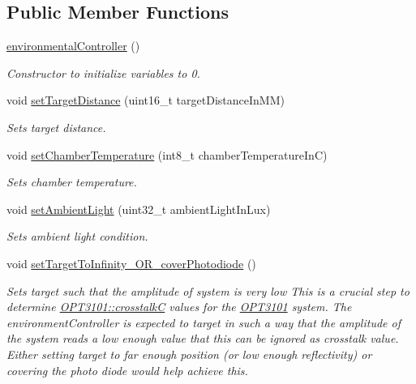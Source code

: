 \subsection*{Public Member Functions}
\begin{DoxyCompactItemize}
\item 
\mbox{\hyperlink{classenvironmental_controller_a2dbb21c983ff11a07ef763fba57b2e76}{environmental\+Controller}} ()
\begin{DoxyCompactList}\small\item\em Constructor to initialize variables to 0. \end{DoxyCompactList}\item 
void \mbox{\hyperlink{classenvironmental_controller_a8251b7f25c6a6c5583c718bac664d05b}{set\+Target\+Distance}} (uint16\+\_\+t target\+Distance\+In\+MM)
\begin{DoxyCompactList}\small\item\em Sets target distance. \end{DoxyCompactList}\item 
void \mbox{\hyperlink{classenvironmental_controller_a3c23e944f34f2d7c0fa0b279d5fc8a3f}{set\+Chamber\+Temperature}} (int8\+\_\+t chamber\+Temperature\+InC)
\begin{DoxyCompactList}\small\item\em Sets chamber temperature. \end{DoxyCompactList}\item 
void \mbox{\hyperlink{classenvironmental_controller_adc63a8d9dbdbcef5768cf34692c6465c}{set\+Ambient\+Light}} (uint32\+\_\+t ambient\+Light\+In\+Lux)
\begin{DoxyCompactList}\small\item\em Sets ambient light condition. \end{DoxyCompactList}\item 
void \mbox{\hyperlink{classenvironmental_controller_a8a1fb44efff232844f00de18e174d4ce}{set\+Target\+To\+Infinity\+\_\+\+O\+R\+\_\+cover\+Photodiode}} ()
\begin{DoxyCompactList}\small\item\em Sets target such that the amplitude of system is very low This is a crucial step to determine \mbox{\hyperlink{class_o_p_t3101_1_1crosstalk_c}{O\+P\+T3101\+::crosstalkC}} values for the \mbox{\hyperlink{namespace_o_p_t3101}{O\+P\+T3101}} system. The environment\+Controller is expected to target in such a way that the amplitude of the system reads a low enough value that this can be ignored as crosstalk value. Either setting target to far enough position (or low enough reflectivity) or covering the photo diode would help achieve this. \end{DoxyCompactList}\end{DoxyCompactItemize}


